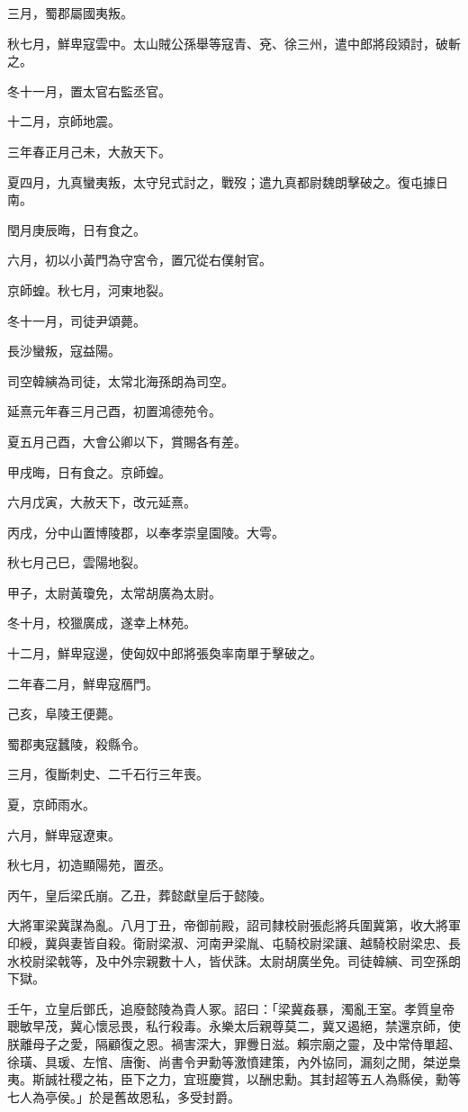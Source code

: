 \begin{pinyinscope}
三月，蜀郡屬國夷叛。

秋七月，鮮卑寇雲中。太山賊公孫舉等寇青、兗、徐三州，遣中郎將段熲討，破斬之。

冬十一月，置太官右監丞官。

十二月，京師地震。

三年春正月己未，大赦天下。

夏四月，九真蠻夷叛，太守兒式討之，戰歿；遣九真都尉魏朗擊破之。復屯據日南。

閏月庚辰晦，日有食之。

六月，初以小黃門為守宮令，置冗從右僕射官。

京師蝗。秋七月，河東地裂。

冬十一月，司徒尹頌薨。

長沙蠻叛，寇益陽。

司空韓縯為司徒，太常北海孫朗為司空。

延熹元年春三月己酉，初置鴻德苑令。

夏五月己酉，大會公卿以下，賞賜各有差。

甲戌晦，日有食之。京師蝗。

六月戊寅，大赦天下，改元延熹。

丙戌，分中山置博陵郡，以奉孝崇皇園陵。大雩。

秋七月己巳，雲陽地裂。

甲子，太尉黃瓊免，太常胡廣為太尉。

冬十月，校獵廣成，遂幸上林苑。

十二月，鮮卑寇邊，使匈奴中郎將張奐率南單于擊破之。

二年春二月，鮮卑寇鴈門。

己亥，阜陵王便薨。

蜀郡夷寇蠶陵，殺縣令。

三月，復斷刺史、二千石行三年喪。

夏，京師雨水。

六月，鮮卑寇遼東。

秋七月，初造顯陽苑，置丞。

丙午，皇后梁氏崩。乙丑，葬懿獻皇后于懿陵。

大將軍梁冀謀為亂。八月丁丑，帝御前殿，詔司隸校尉張彪將兵圍冀第，收大將軍印綬，冀與妻皆自殺。衛尉梁淑、河南尹梁胤、屯騎校尉梁讓、越騎校尉梁忠、長水校尉梁戟等，及中外宗親數十人，皆伏誅。太尉胡廣坐免。司徒韓縯、司空孫朗下獄。

壬午，立皇后鄧氏，追廢懿陵為貴人冢。詔曰：「梁冀姦暴，濁亂王室。孝質皇帝聰敏早茂，冀心懷忌畏，私行殺毒。永樂太后親尊莫二，冀又遏絕，禁還京師，使朕離母子之愛，隔顧復之恩。禍害深大，罪釁日滋。賴宗廟之靈，及中常侍單超、徐璜、具瑗、左悺、唐衡、尚書令尹勳等激憤建策，內外協同，漏刻之閒，桀逆梟夷。斯誠社稷之祐，臣下之力，宜班慶賞，以酬忠勳。其封超等五人為縣侯，勳等七人為亭侯。」於是舊故恩私，多受封爵。


\end{pinyinscope}
